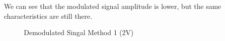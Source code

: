 \documentclass[12pt]{article}
\begin{document}
We can see that the modulated signal amplitude is lower, but the same characteristics are still there.
\begin{figure}[H]
    \centering
    \caption{Demodulated Singal Method 1 (2V)}
\end{figure}
\end{document}
